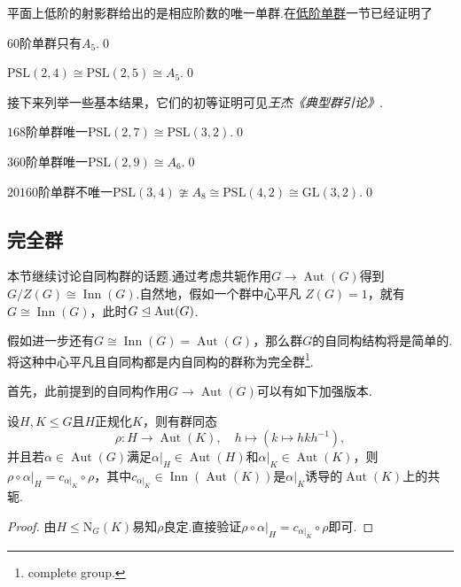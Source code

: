 平面上低阶的射影群给出的是相应阶数的唯一单群.在\hyperlink{subsec:SimpleGrpLowOrder}{低阶单群}一节已经证明了
\begin{prop}
	$60$阶单群只有$A_5$.\qed
\end{prop}
\begin{cor*}
	$\mathrm{PSL}(2,4)\cong\mathrm{PSL}(2,5)\cong A_5$.\qed
\end{cor*}

接下来列举一些基本结果，它们的初等证明可见\emph{王杰《典型群引论》}.
\begin{prop}
	$168$阶单群唯一$\mathrm{PSL}(2,7)\cong\mathrm{PSL}(3,2)$.\qed
\end{prop}
\begin{prop}
	$360$阶单群唯一$\mathrm{PSL}(2,9)\cong A_6$.\qed
\end{prop}
\begin{prop}
	$20160$阶单群不唯一$\mathrm{PSL}(3,4)\ncong A_8\cong\mathrm{PSL}(4,2)\cong\mathrm{GL}(3,2)$.\qed
\end{prop}

\subsection{完全群}\label{subsec:CompleteGrp}
本节继续讨论自同构群的话题.通过考虑共轭作用$G\to\operatorname*{Aut}(G)$得到$G/Z(G)\cong\operatorname*{Inn}(G)$.自然地，假如一个群{\heiti 中心平凡} $Z(G)=1$，就有$G\cong\operatorname*{Inn}(G)$，此时$G\trianglelefteq\operatorname*{Aut}(G)$.

假如进一步还有$G\cong\operatorname*{Inn}(G)=\operatorname*{Aut}(G)$，那么群$G$的自同构结构将是简单的.将这种中心平凡且自同构都是内自同构的群称为{\heiti 完全群}\footnote{complete group.}.

首先，此前提到的自同构作用$G\to\operatorname*{Aut}(G)$可以有如下加强版本.
\begin{lemma*}[(自同构群作用)]
	设$H,K\le G$且$H$正规化$K$，则有群同态
	\[
		\rho\colon H\to\operatorname*{Aut}(K),\quad h\mapsto(k\mapsto hkh^{-1}),
	\]
	并且若$\alpha\in\operatorname*{Aut}(G)$满足$\alpha|_H\in\operatorname*{Aut}(H)$和$\alpha|_K\in\operatorname*{Aut}(K)$，则$\rho\circ\alpha|_H=c_{\alpha|_K}\circ\rho$，其中$c_{\alpha|_K}\in\operatorname*{Inn}(\operatorname*{Aut}(K))$是$\alpha|_K$诱导的$\operatorname*{Aut}(K)$上的共轭.
\end{lemma*}
\begin{proof}
	由$H\le\mathrm{N}_G(K)$易知$\rho$良定.直接验证$\rho\circ\alpha|_H=c_{\alpha|_K}\circ\rho$即可.
\end{proof}

